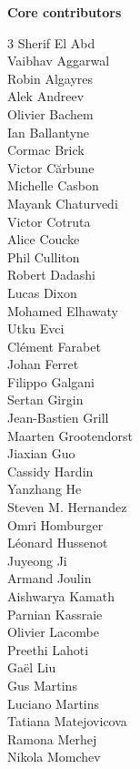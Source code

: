 \onecolumn
\noindent\textbf{Core contributors} \\

\begin{multicols}{3}
\noindent
Sherif El Abd \\ 
Vaibhav Aggarwal \\ 
Robin Algayres \\ 
Alek Andreev \\ 
Olivier Bachem \\ 
Ian Ballantyne \\ 
Cormac Brick \\ 
Victor Cărbune \\ 
Michelle Casbon \\ 
Mayank Chaturvedi \\ 
Victor Cotruta \\ 
Alice Coucke \\ 
Phil Culliton \\ 
Robert Dadashi \\ 
Lucas Dixon \\ 
Mohamed Elhawaty \\ 
Utku Evci \\ 
Clément Farabet \\ 
Johan Ferret \\ 
Filippo Galgani \\ 
Sertan Girgin \\ 
Jean-Bastien Grill \\ 
Maarten Grootendorst \\ 
Jiaxian Guo \\ 
Cassidy Hardin \\ 
Yanzhang He \\ 
Steven M. Hernandez \\ 
Omri Homburger \\ 
Léonard Hussenot \\ 
Juyeong Ji \\ 
Armand Joulin \\ 
Aishwarya Kamath \\ 
Parnian Kassraie \\ 
Olivier Lacombe \\ 
Preethi Lahoti \\ 
Gaël Liu \\ 
Gus Martins \\ 
Luciano Martins \\ 
Tatiana Matejovicova \\ 
Ramona Merhej \\ 
Nikola Momchev \\ 

\end{multicols}
